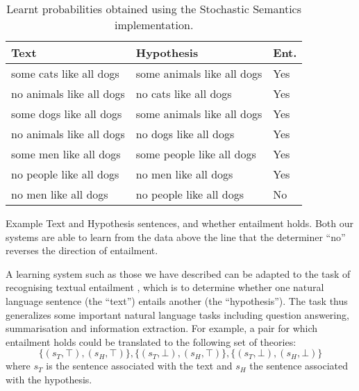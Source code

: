 \documentclass[a4paper,11pt]{article}
\renewcommand{\cite}{\citep}
\theoremstyle{definition}
\begin{document}
\begin{table*}
  \parbox{.62\linewidth}{
    \begin{center}
      \begin{tabular}{|l|l|l|}
        \hline
        Text & Hypothesis & Ent.\\
        \hline
        some cats like all dogs & some animals like all dogs & Yes\\
        no animals like all dogs & no cats like all dogs & Yes\\
        some dogs like all dogs & some animals like all dogs & Yes\\
        no animals like all dogs & no dogs like all dogs & Yes\\
        some men like all dogs & some people like all dogs & Yes\\
        \hline
        no people like all dogs & no men like all dogs & Yes\\
        no men like all dogs & no people like all dogs & No\\
        \hline
      \end{tabular}
      \caption{Example Text and Hypothesis sentences, and whether
        entailment holds. Both our systems are able to learn from the
        data above the line that the determiner ``no'' reverses the
        direction of entailment.}
      \label{table:mono}
    \end{center}
  }
  \hfill
  \parbox{.32\linewidth}{
    \centering
    \caption{Learnt probabilities obtained using the
      Stochastic Semantics implementation.}
    \label{table:lexical-sato}
  }
\end{table*}

A learning system such as those we have described can be adapted to
the task of recognising textual entailment \cite{Dagan:05}, which is
to determine whether one natural language sentence (the ``text'')
entails another (the ``hypothesis''). The task thus generalizes some
important natural language tasks including question answering,
summarisation and information extraction.  For example, a pair for
which entailment holds could be translated to the following set of
theories:
\[
\{(s_T,\top),(s_H,\top)\},  \{(s_T,\bot),(s_H,\top)\},\{(s_T,\bot),(s_H,\bot)\}
\]
where $s_T$ is the sentence associated with the text and $s_H$ the
sentence associated with the hypothesis.
\end{document}
